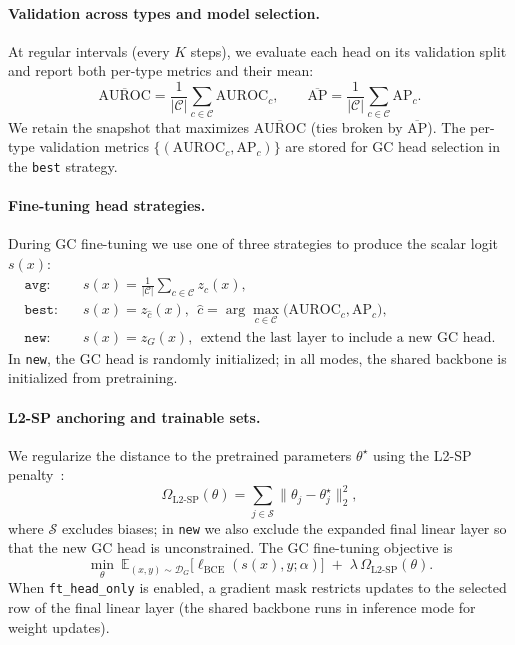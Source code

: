 \documentclass[journal,article,submit,pdftex,moreauthors]{Definitions/mdpi}
\begin{document}
\paragraph{Validation across types and model selection.}
At regular intervals (every $K$ steps), we evaluate each head on its validation split and report both per-type metrics and their mean:
\begin{equation}
\overline{\mathrm{AUROC}}=\frac{1}{|\mathcal{C}|}\sum_{c\in\mathcal{C}}\mathrm{AUROC}_c,\qquad
\overline{\mathrm{AP}}=\frac{1}{|\mathcal{C}|}\sum_{c\in\mathcal{C}}\mathrm{AP}_c.
\end{equation}
We retain the snapshot that maximizes $\overline{\mathrm{AUROC}}$ (ties broken by $\overline{\mathrm{AP}}$). The per-type validation metrics $\{(\mathrm{AUROC}_c,\mathrm{AP}_c)\}$ are stored for GC head selection in the \texttt{best} strategy.

\paragraph{Fine-tuning head strategies.}
During GC fine-tuning we use one of three strategies to produce the scalar logit $s(x)$:
\begin{align}
\texttt{avg:}\quad & s(x)=\frac{1}{|\mathcal{C}|}\sum_{c\in\mathcal{C}} z_c(x),\\
\texttt{best:}\quad & s(x)=z_{\hat c}(x),\ \ \hat c=\arg\max_{c\in\mathcal{C}}\big(\mathrm{AUROC}_c,\mathrm{AP}_c\big),\\
\texttt{new:}\quad & s(x)=z_G(x),\ \ \text{extend the last layer to include a new GC head.}
\end{align}
In \texttt{new}, the GC head is randomly initialized; in all modes, the shared backbone is initialized from pretraining.

\paragraph{L2-SP anchoring and trainable sets.}
We regularize the distance to the pretrained parameters $\theta^\star$ using the L2-SP penalty~\citep{Li2018_L2SP}:
\begin{equation}
\Omega_{\mathrm{L2\text{-}SP}}(\theta)=\sum_{j\in\mathcal{S}}\|\theta_j-\theta^\star_j\|_2^2,
\end{equation}
where $\mathcal{S}$ excludes biases; in \texttt{new} we also exclude the expanded final linear layer so that the new GC head is unconstrained. The GC fine-tuning objective is
\begin{equation}
\label{eq:ft_obj}
\min_{\theta}\ \mathbb{E}_{(x,y)\sim \mathcal{D}_G}\!\big[\ell_{\mathrm{BCE}}(s(x),y;\alpha)\big]\;+\;\lambda\,\Omega_{\mathrm{L2\text{-}SP}}(\theta).
\end{equation}
When \texttt{ft\_head\_only} is enabled, a gradient mask restricts updates to the selected row of the final linear layer (the shared backbone runs in inference mode for weight updates).
\end{document}
